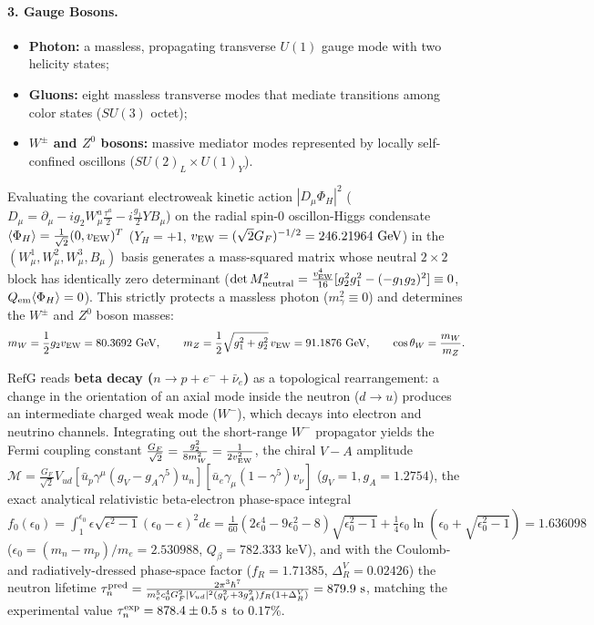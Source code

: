 \documentclass[11pt,a4paper]{article}
\newcommand{\RefG}{\mathrm{RefG}}
\begin{document}
\paragraph{3. Gauge Bosons.}
\begin{itemize}
\item \textbf{Photon:} a massless, propagating transverse $U(1)$ gauge mode with two helicity states;
\item \textbf{Gluons:} eight massless transverse modes that mediate transitions among color states ($SU(3)$ octet);
\item \textbf{$W^\pm$ and $Z^0$ bosons:} massive mediator modes represented by locally self-confined oscillons ($SU(2)_L\times U(1)_Y$).
\end{itemize}

Evaluating the covariant electroweak kinetic action $|D_\mu \Phi_H|^2$ ($D_\mu = \partial_\mu - i g_2 W_\mu^a \frac{\tau^a}{2} - i\frac{g_1}{2}Y B_\mu$) on the radial spin-0 oscillon-Higgs condensate $\langle\Phi_H\rangle = \frac{1}{\sqrt{2}}(0, v_{\rm EW})^T$ ($Y_H = +1$, $v_{\rm EW} = (\sqrt{2}G_F)^{-1/2} = 246.21964\text{ GeV}$) in the $(W_\mu^1, W_\mu^2, W_\mu^3, B_\mu)$ basis generates a mass-squared matrix whose neutral $2\times 2$ block has identically zero determinant ($\det M_{\rm neutral}^2 = \frac{v_{\rm EW}^4}{16}[g_2^2 g_1^2 - (-g_1 g_2)^2] \equiv 0$, $Q_{\rm em}\langle\Phi_H\rangle = 0$). This strictly protects a massless photon ($m_\gamma^2 \equiv 0$) and determines the $W^\pm$ and $Z^0$ boson masses:
\begin{equation}
m_W = \frac{1}{2}g_2 v_{\rm EW} = 80.3692\text{ GeV}, \qquad m_Z = \frac{1}{2}\sqrt{g_1^2 + g_2^2}\,v_{\rm EW} = 91.1876\text{ GeV}, \qquad \cos\theta_W = \frac{m_W}{m_Z}.
\end{equation}

$\RefG$ reads \textbf{beta decay ($n\to p+e^-+\bar{\nu}_e$)} as a topological rearrangement: a change in the orientation of an axial mode inside the neutron ($d\to u$) produces an intermediate charged weak mode ($W^-$), which decays into electron and neutrino channels. Integrating out the short-range $W^-$ propagator yields the Fermi coupling constant $\frac{G_F}{\sqrt{2}} = \frac{g_2^2}{8 m_W^2} = \frac{1}{2 v_{\rm EW}^2}$, the chiral $V-A$ amplitude $\mathcal{M} = \frac{G_F}{\sqrt{2}}V_{ud}[\bar{u}_p\gamma^\mu(g_V - g_A\gamma^5)u_n][\bar{u}_e\gamma_\mu(1-\gamma^5)v_\nu]$ ($g_V = 1, g_A = 1.2754$), the exact analytical relativistic beta-electron phase-space integral $f_0(\epsilon_0) = \int_1^{\epsilon_0}\epsilon\sqrt{\epsilon^2-1}(\epsilon_0-\epsilon)^2 d\epsilon = \frac{1}{60}(2\epsilon_0^4 - 9\epsilon_0^2 - 8)\sqrt{\epsilon_0^2-1} + \frac{1}{4}\epsilon_0\ln(\epsilon_0 + \sqrt{\epsilon_0^2-1}) = 1.636098$ ($\epsilon_0 = (m_n - m_p)/m_e = 2.530988$, $Q_\beta = 782.333\text{ keV}$), and with the Coulomb- and radiatively-dressed phase-space factor ($f_R = 1.71385$, $\Delta_R^V = 0.02426$) the neutron lifetime $\tau_n^{\rm pred} = \frac{2\pi^3\hbar^7}{m_e^5 c_0^4 G_F^2 |V_{ud}|^2(g_V^2 + 3 g_A^2)f_R(1+\Delta_R^V)} = 879.9\text{ s}$, matching the experimental value $\tau_n^{\rm exp} = 878.4 \pm 0.5\text{ s}$ to $0.17\%$.
\end{document}
